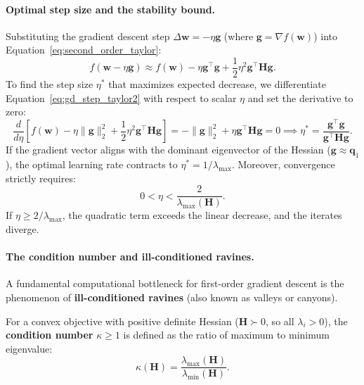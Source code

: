 \paragraph{Optimal step size and the stability bound.}
Substituting the gradient descent step $\Delta \mathbf{w} = -\eta \mathbf{g}$ (where $\mathbf{g} = \nabla f(\mathbf{w})$) into Equation~\eqref{eq:second_order_taylor}:
\begin{equation}
f(\mathbf{w} - \eta \mathbf{g}) \approx f(\mathbf{w}) - \eta \mathbf{g}^\top \mathbf{g} + \frac{1}{2} \eta^2 \mathbf{g}^\top \mathbf{H} \mathbf{g}.
\label{eq:gd_step_taylor2}
\end{equation}
To find the step size $\eta^*$ that maximizes expected decrease, we differentiate Equation~\eqref{eq:gd_step_taylor2} with respect to scalar $\eta$ and set the derivative to zero:
\begin{equation}
\frac{d}{d\eta} \left[ f(\mathbf{w}) - \eta \|\mathbf{g}\|_2^2 + \frac{1}{2} \eta^2 \mathbf{g}^\top \mathbf{H} \mathbf{g} \right] = -\|\mathbf{g}\|_2^2 + \eta \mathbf{g}^\top \mathbf{H} \mathbf{g} = 0 \implies \eta^* = \frac{\mathbf{g}^\top \mathbf{g}}{\mathbf{g}^\top \mathbf{H} \mathbf{g}}.
\label{eq:optimal_eta_hessian}
\end{equation}
If the gradient vector aligns with the dominant eigenvector of the Hessian ($\mathbf{g} \approx \mathbf{q}_1$), the optimal learning rate contracts to $\eta^* = 1/\lambda_{\max}$. Moreover, convergence strictly requires:
\begin{equation}
0 < \eta < \frac{2}{\lambda_{\max}(\mathbf{H})}.
\label{eq:learning_rate_stability_bound}
\end{equation}
If $\eta \ge 2/\lambda_{\max}$, the quadratic term exceeds the linear decrease, and the iterates diverge.

\paragraph{The condition number and ill-conditioned ravines.}
A fundamental computational bottleneck for first-order gradient descent is the phenomenon of \textbf{ill-conditioned ravines} (also known as valleys or canyons).

\begin{definition}
For a convex objective with positive definite Hessian ($\mathbf{H} \succ 0$, so all $\lambda_i > 0$), the \textbf{condition number} $\kappa \ge 1$ is defined as the ratio of maximum to minimum eigenvalue:
\begin{equation}
\kappa(\mathbf{H}) = \frac{\lambda_{\max}(\mathbf{H})}{\lambda_{\min}(\mathbf{H})}.
\label{eq:condition_number_def}
\end{equation}
\end{definition}

